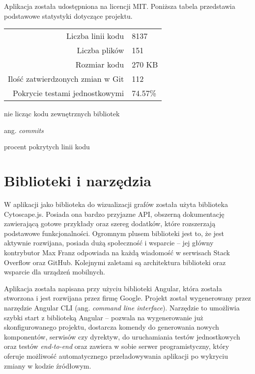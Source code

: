 Aplikacja została udostępniona na licencji MIT. Poniższa tabela przedstawia podstawowe statystyki dotyczące projektu.

\bigskip
\begin{table}[H]
\begin{threeparttable}
\centering
\noindent\begin{tabularx}{\textwidth}{r|X|}
\cline{2-2}
  Liczba linii kodu\tnote{1} & 8137 \\ 
\cline{2-2}
  Liczba plików\tnote{1} & 151 \\ 
\cline{2-2}
 Rozmiar kodu\tnote{1} & 270 KB \\ 
\cline{2-2}
 Ilość zatwierdzonych zmian w Git\tnote{2} & 112 \\ 
\cline{2-2}
 Pokrycie testami jednostkowymi\tnote{3} & 74.57\% \\ 
\cline{2-2}
\end{tabularx} 
\begin{tablenotes}
{\footnotesize\medskip
\item[1] nie licząc kodu zewnętrznych bibliotek
\item[2] ang. \textit{commits}
\item[3] procent pokrytych linii kodu
}
\end{tablenotes}
\end{threeparttable}
\end{table}
\bigskip


\section{Biblioteki i narzędzia}

W aplikacji jako biblioteka do wizualizacji grafów została użyta biblioteka Cytoscape.js. Posiada ona bardzo przyjazne API, obszerną dokumentację zawierającą gotowe przykłady oraz szereg dodatków, które rozszerzają podstawowe funkcjonalności. Ogromnym plusem biblioteki jest to, że jest aktywnie rozwijana, posiada dużą społeczność i wsparcie -- jej główny kontrybutor Max Franz odpowiada na każdą wiadomość w serwisach Stack Overflow oraz GitHub. Kolejnymi zaletami są architektura biblioteki oraz wsparcie dla urządzeń mobilnych.

Aplikacja została napisana przy użyciu biblioteki Angular, która została stworzona i jest rozwijana przez firmę Google. Projekt został wygenerowany przez narzędzie Angular CLI (ang. \textit{command line interface}). Narzędzie to umożliwia szybki start z biblioteką Angular -- pozwala na wygenerowanie już skonfigurowanego projektu, dostarcza komendy do generowania nowych komponentów, serwisów czy dyrektyw, do uruchamiania testów jednostkowych oraz testów \textit{end-to-end} oraz zawiera w sobie serwer programistyczny, który oferuje możliwość automatycznego przeładowywania aplikacji po wykryciu zmiany w kodzie źródłowym. 

